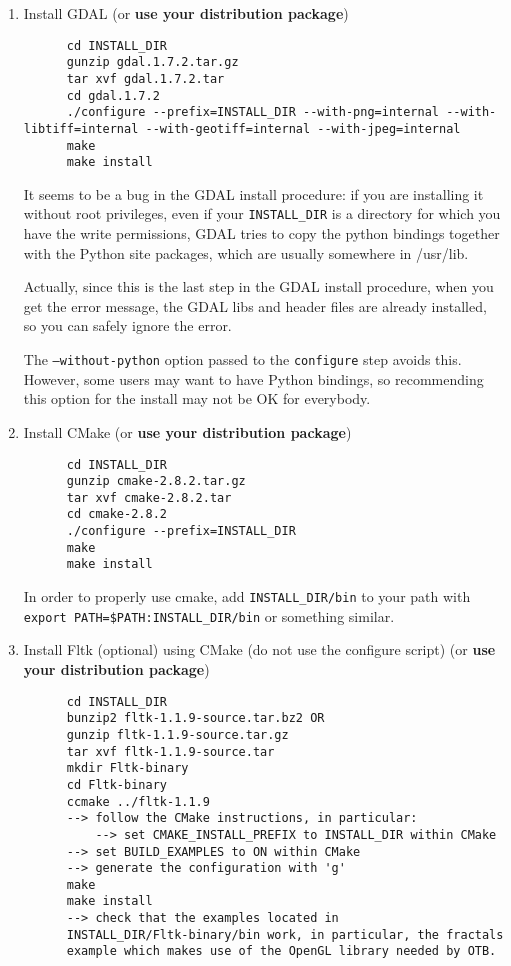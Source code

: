 \begin{enumerate}

\item Install GDAL (or \textbf{use your distribution package})
  \begin{verbatim}
      cd INSTALL_DIR
      gunzip gdal.1.7.2.tar.gz
      tar xvf gdal.1.7.2.tar
      cd gdal.1.7.2
      ./configure --prefix=INSTALL_DIR --with-png=internal --with-libtiff=internal --with-geotiff=internal --with-jpeg=internal
      make
      make install
  \end{verbatim}

It seems to be a bug in the GDAL install procedure: if you are installing it without root privileges, even if your \texttt{INSTALL\_DIR} is a directory for which you have the write permissions, GDAL tries to copy the python bindings together with the Python site packages, which are usually somewhere in /usr/lib.

Actually, since this is the last step in the GDAL install procedure, when you get the error message, the GDAL libs and header files are already installed, so you can safely ignore the error.

The \texttt{--without-python} option passed to the \texttt{configure} step avoids this. However, some users may want to have Python bindings, so recommending this option for the install may not be OK for everybody.

\item Install CMake (or \textbf{use your distribution package})
  \begin{verbatim}
      cd INSTALL_DIR
      gunzip cmake-2.8.2.tar.gz
      tar xvf cmake-2.8.2.tar
      cd cmake-2.8.2
      ./configure --prefix=INSTALL_DIR
      make
      make install
  \end{verbatim}
      In order to properly use cmake, add \texttt{INSTALL\_DIR/bin} to
      your path with \texttt{export PATH=\$PATH:INSTALL\_DIR/bin} or
      something similar.

\item Install Fltk (optional) using CMake (do not use the configure script) (or \textbf{use your distribution package})
  \begin{verbatim}
      cd INSTALL_DIR
      bunzip2 fltk-1.1.9-source.tar.bz2 OR
      gunzip fltk-1.1.9-source.tar.gz
      tar xvf fltk-1.1.9-source.tar
      mkdir Fltk-binary
      cd Fltk-binary
      ccmake ../fltk-1.1.9
      --> follow the CMake instructions, in particular:
          --> set CMAKE_INSTALL_PREFIX to INSTALL_DIR within CMake
	  --> set BUILD_EXAMPLES to ON within CMake
	  --> generate the configuration with 'g'
      make
      make install
      --> check that the examples located in
      INSTALL_DIR/Fltk-binary/bin work, in particular, the fractals
      example which makes use of the OpenGL library needed by OTB.
  \end{verbatim}


\end{enumerate}
